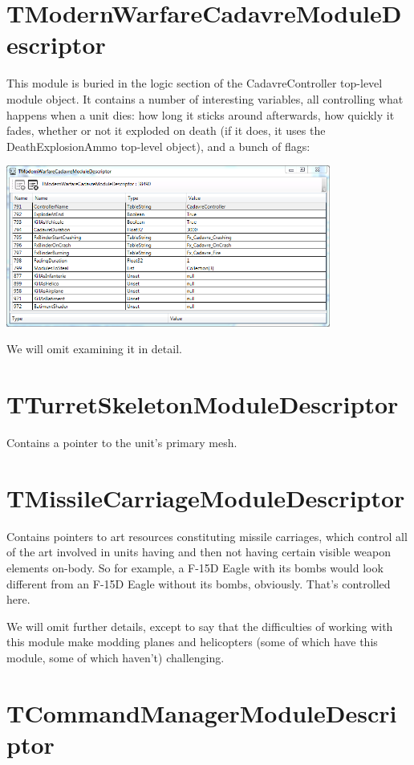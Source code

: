 \documentclass{article}
\begin{document}
\section{TModernWarfareCadavreModuleDescriptor}

This module is buried in the logic section of the CadavreController top-level module object. It contains a number of interesting variables, all controlling what happens when a unit dies: how long it sticks around afterwards, how quickly it fades, whether or not it exploded on death (if it does, it uses the DeathExplosionAmmo top-level object), and a bunch of flags:

\includegraphics[width=0.8\textwidth]{screenshot_cadavre}

We will omit examining it in detail.

\section{TTurretSkeletonModuleDescriptor}

Contains a pointer to the unit's primary mesh.

\section{TMissileCarriageModuleDescriptor}

Contains pointers to art resources constituting missile carriages, which control all of the art involved in units having and then not having certain visible weapon elements on-body. So for example, a F-15D Eagle with its bombs would look different from an F-15D Eagle without its bombs, obviously. That's controlled here.

We will omit further details, except to say that the difficulties of working with this module make modding planes and helicopters (some of which have this module, some of which haven't) challenging.

\section{TCommandManagerModuleDescriptor}
\end{document}
